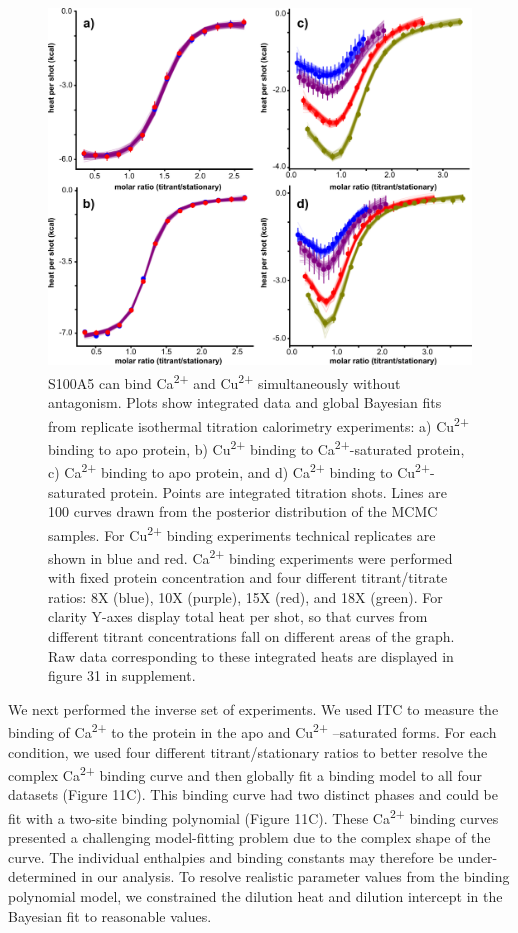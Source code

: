 \begin{figure}
\centering
	\includegraphics{ch4-fig2.png} 
\caption[S100A5 can bind Ca\textsuperscript{2+} and Cu\textsuperscript{2+} 
without antagonism]{S100A5 can bind Ca\textsuperscript{2+} and Cu\textsuperscript{2+} 
simultaneously without antagonism. Plots show integrated data and
global Bayesian fits from replicate isothermal titration calorimetry
experiments: a) Cu\textsuperscript{2+} binding to apo protein, b)
Cu\textsuperscript{2+} binding to Ca\textsuperscript{2+}-saturated
protein, c) Ca\textsuperscript{2+} binding to apo protein, and d)
Ca\textsuperscript{2+} binding to Cu\textsuperscript{2+}-saturated
protein. Points are integrated titration shots. Lines are 100 curves
drawn from the posterior distribution of the MCMC samples. For Cu\textsuperscript{2+} 
binding experiments technical replicates are shown in blue and red.
Ca\textsuperscript{2+} binding experiments were performed with fixed
protein concentration and four different titrant/titrate ratios: 8X
(blue), 10X (purple), 15X (red), and 18X (green). For clarity Y-axes
display total heat per shot, so that curves from different titrant
concentrations fall on different areas of the graph. Raw data corresponding
to these integrated heats are displayed in figure 31 in supplement.\label{samplefigure}}	
\end{figure}

We next performed the inverse set of experiments. We used ITC to measure
the binding of Ca\textsuperscript{2+} to the protein in the apo and
Cu\textsuperscript{2+} –saturated forms. For each condition, we used
four different titrant/stationary ratios to better resolve the complex
Ca\textsuperscript{2+} binding curve and then globally fit a binding
model to all four datasets (Figure 11C). This binding curve had two
distinct phases and could be fit with a two-site binding polynomial
(Figure 11C). These Ca\textsuperscript{2+} binding curves presented
a challenging model-fitting problem due to the complex shape of the
curve. The individual enthalpies and binding constants may therefore
be under-determined in our analysis. To resolve realistic parameter
values from the binding polynomial model, we constrained the dilution
heat and dilution intercept in the Bayesian fit to reasonable values. 

